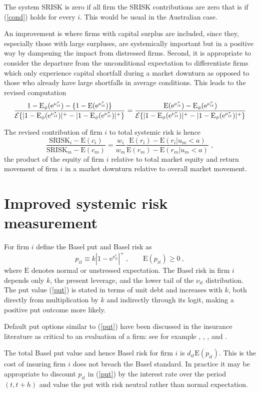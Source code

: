 \documentclass[authoryear]{elsarticle}
\newcommand{\E}{\mathrm{E}}
\newcommand{\e}{\mathrm{e}}
\newcommand{\Ex}{{\cal E}}
\newcommand{\eref}[1]{(\ref{#1})}
\newcommand{\cq}{\ , \qquad}
\newcommand{\be}[1]{\begin{equation}\label{#1}}
\newcommand{\ee}{\end{equation}}
\begin{document}
The system SRISK is zero if all firm the SRISK contributions are zero that is if \eref{cond} holds for every $i$.  This would be usual in the Australian case.



An improvement is where firms with capital surplus are included, since they, especially those with large surpluses, are systemically important but in a positive way by dampening the impact from distressed firms.  Second, it is  appropriate to consider the departure from the unconditional expectation to differentiate firms which only experience capital shortfall during a market downturn as opposed to those who already have large shortfalls in average conditions.   This leads to the revised computation
$$
\frac{1-\Es(\e^{\nu^*_{it}})-\{1-\E(\e^{\nu^*_{it}})\}}{\Ex\{|1-\Es(\e^{\nu^*_{it}})|^+-|1-\Es(\e^{\nu^*_{it}})|^+\}} = \frac{\E(\e^{\nu^*_{it}})-\Es(\e^{\nu^*_{it}})}{\Ex\{|1-\Es(\e^{\nu^*_{it}})|^+-|1-\Es(\e^{\nu^*_{it}})|^+\}} 
$$


The revised contribution of firm $i$ to total systemic risk is hence
$$
\frac{\mathrm{SRISK}_i-\E(c_i)}{\mathrm{SRISK}_m-\E(c_m)}
=\frac{w_i }{w_m } \frac{\E(r_i)-\E(r_i|u_m<a)}{\E(r_m)-\E(r_m|u_m<a)} \;,
$$
the product of the equity of firm $i$ relative to total market equity and return movement of firm $i$ in a market downturn relative to overall market movement.

\section{Improved systemic risk measurement}

For  firm $i$ define the  Basel put and  Basel risk as 
\be{put}
p_{it}\equiv k |1-\e^{\nu^*_{it}}|^+\cq \E(p_{it})\ge 0\ ,
\ee
where $\E$ denotes normal or unstressed expectation.  The Basel risk in firm $i$ depends only $k$,  the present leverage,  and the lower tail of the  $\nu_{it}$ distribution.  The put value \eref{put} is stated in terms of unit debt and increases with $k$, both directly from  multiplication by $k$ and indirectly through its logit, making a positive put outcome more likely.  

Default put options similar to \eref{put} have been discussed in the insurance literature as critical to an evaluation of a firm:  see for
example \citet{merton1977analytic}, \citet{doherty1986price}, \citet{cummins1988risk}, \citet{myers2001capital} and \citet{sherris2006solvency}.

The total Basel put value and hence Basel risk for firm  $i$ is   $d_{it}\E(p_{it})$.   This is the cost of insuring firm $i$ does not breach the Basel standard.  In practice it may be appropriate to discount $p_{it}$ in \eref{put} by the interest rate over the period $(t,t+h)$ and value the put with risk neutral rather than normal expectation.       
\end{document}
